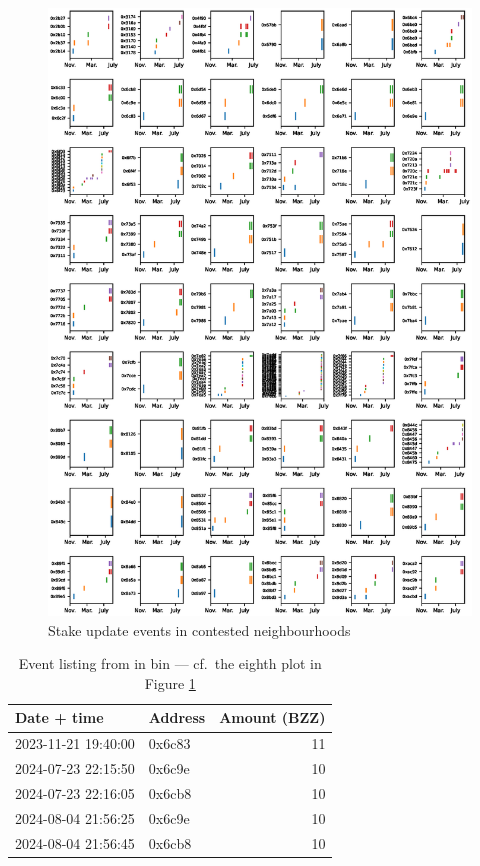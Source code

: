 \begin{center}
  \begin{figure}[p]
    \includegraphics[width=\textwidth]{common/contested.eps}
    \caption{Stake update events in contested neighbourhoods}
    \label{event-plot}
  \end{figure}
  \end{center}
  

  \begin{table}
    \begin{center}
  \begin{tabular}{llr}
  Date + time         & Address & Amount (BZZ) \\
  \hline
  2023-11-21 19:40:00 & 0x6c83 &   11 \\
  2024-07-23 22:15:50 &	0x6c9e  &	10 \\
  2024-07-23 22:16:05 &	0x6cb8  &	10 \\
  2024-08-04 21:56:25 &	0x6c9e  &	10 \\
  2024-08-04 21:56:45 &	0x6cb8  &	10
  \end{tabular}
  \caption{Event listing from in bin  --- cf.~the eighth plot in Figure \ref{event-plot}}
  \label{event-listing}
  \end{center}
  \end{table}

